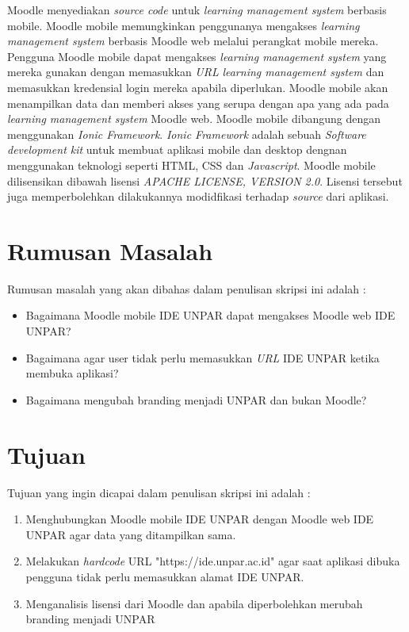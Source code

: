 Moodle menyediakan \textit{source code} untuk \textit{learning management system} berbasis mobile. Moodle mobile memungkinkan penggunanya mengakses \textit{learning management system} berbasis Moodle web melalui perangkat mobile mereka. Pengguna Moodle mobile dapat mengakses \textit{learning management system} yang mereka gunakan dengan memasukkan \textit{URL} \textit{learning management system} dan memasukkan kredensial login mereka apabila diperlukan. Moodle mobile akan menampilkan data dan memberi akses yang serupa dengan apa yang ada pada \textit{learning management system} Moodle web. Moodle mobile dibangung dengan menggunakan \textit{Ionic Framework}. \textit{Ionic Framework} adalah sebuah \textit{Software development kit} untuk membuat aplikasi mobile dan desktop dengnan menggunakan teknologi seperti HTML, CSS dan \textit{Javascript}\cite{Ionic:intro}. Moodle mobile dilisensikan dibawah lisensi   \textit{APACHE LICENSE, VERSION 2.0}. Lisensi tersebut juga memperbolehkan dilakukannya modidfikasi terhadap \textit{source} dari aplikasi.



\section{Rumusan Masalah}
\label{sec:rumusan}
Rumusan masalah yang akan dibahas dalam penulisan skripsi ini adalah :
\begin{itemize}
	\item Bagaimana Moodle mobile IDE UNPAR dapat mengakses Moodle web IDE UNPAR?
	\item Bagaimana agar user tidak perlu memasukkan \textit{URL} IDE UNPAR ketika membuka aplikasi?
	\item Bagaimana mengubah branding menjadi UNPAR dan bukan Moodle?
\end{itemize}

\section{Tujuan}
\label{sec:tujuan}
Tujuan yang ingin dicapai dalam penulisan skripsi ini adalah :
\begin{enumerate}
	\item Menghubungkan Moodle mobile IDE UNPAR dengan Moodle web IDE UNPAR agar data yang ditampilkan sama.
	\item Melakukan \textit{hardcode} URL "https://ide.unpar.ac.id" agar saat aplikasi dibuka pengguna tidak perlu memasukkan alamat IDE UNPAR.
	\item Menganalisis lisensi dari Moodle dan apabila diperbolehkan merubah branding menjadi UNPAR
\end{enumerate}

